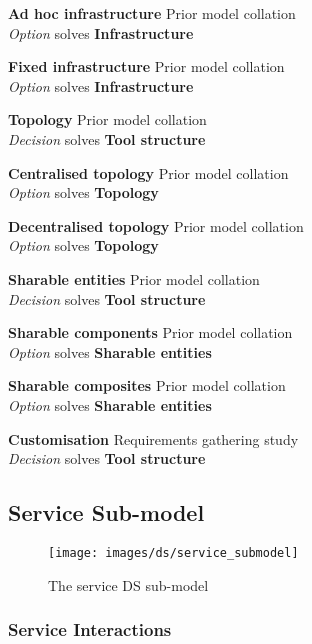 \textbf{Ad hoc infrastructure} \hfill Prior model collation \cite{Bronsted2010a} \\ \emph{Option} \hfill solves \textbf{Infrastructure}

\textbf{Fixed infrastructure} \hfill Prior model collation \cite{Bronsted2010a} \\ \emph{Option} \hfill solves \textbf{Infrastructure}

\textbf{Topology} \hfill Prior model collation \cite{Bronsted2010a} \\ \emph{Decision} \hfill solves \textbf{Tool structure}

\textbf{Centralised topology} \hfill Prior model collation \cite{Bronsted2010a} \\ \emph{Option} \hfill solves \textbf{Topology}

\textbf{Decentralised topology} \hfill Prior model collation \cite{Bronsted2010a} \\ \emph{Option} \hfill solves \textbf{Topology}

\textbf{Sharable entities} \hfill Prior model collation \cite{Grammel2010} \\ \emph{Decision} \hfill solves \textbf{Tool structure}

\textbf{Sharable components} \hfill Prior model collation \cite{Grammel2010} \\ \emph{Option} \hfill solves \textbf{Sharable entities}

\textbf{Sharable composites} \hfill Prior model collation \cite{Grammel2010} \\ \emph{Option} \hfill solves \textbf{Sharable entities}

\textbf{Customisation} \hfill Requirements gathering study \\ \emph{Decision} \hfill solves \textbf{Tool structure}

\subsection{Service Sub-model}

\begin{figure}[htb]
	\centering
	\texttt{[image: images/ds/service\_submodel]}
	\caption{The service DS sub-model}
	\label{ds:fig:service}
\end{figure}

\clearpage

\subsubsection{Service Interactions}

